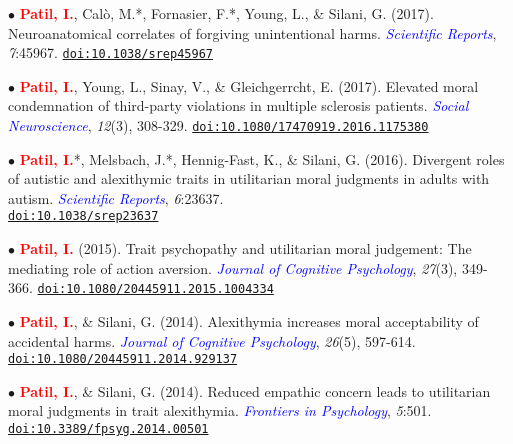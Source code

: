 \documentclass[10pt]{article}
\begin{document}
	$\bullet$ \textbf{\textcolor{red}{Patil, I.}}, Cal\`{o}, M.*, Fornasier, F.*, Young, L., \& Silani, G. (2017). Neuroanatomical correlates of forgiving \hspace*{0.1in}unintentional harms. \textit{\textcolor{blue}{Scientific Reports}}, \textit{7}:45967. \href{https://drive.google.com/open?id=0B6_u70YpdJKnRV81UnNlZHdrdXM}{\tt doi:10.1038/srep45967}
	\miniskip
	
	$\bullet$ \textbf{\textcolor{red}{Patil, I.}}, Young, L., Sinay, V., \& Gleichgerrcht, E. (2017). Elevated moral condemnation of third-party \hspace*{0.1in}violations in multiple sclerosis patients. \textit{\textcolor{blue}{Social Neuroscience}}, \textit{12}(3), 308-329. \hspace*{0.1in}\href{https://drive.google.com/open?id=0B6_u70YpdJKnT3M0bWpPdDY4RHc}{\tt doi:10.1080/17470919.2016.1175380}
	\miniskip
	
	$\bullet$ \textbf{\textcolor{red}{Patil, I.}}*, Melsbach, J.*, Hennig-Fast, K., \& Silani, G. (2016). Divergent roles of autistic and alexithymic \hspace*{0.1in}traits in utilitarian moral judgments in adults with autism. \textit{\textcolor{blue}{Scientific Reports}}, \textit{6}:23637.\\
	\hspace*{0.1in}\href{https://drive.google.com/file/d/0B6_u70YpdJKnV1p2UmNwa09iS1k/view?usp=sharing}{\tt doi:10.1038/srep23637}
	\miniskip
	
	$\bullet$ \textbf{\textcolor{red}{Patil, I.}} (2015). Trait psychopathy and utilitarian moral judgement: The mediating role of action aversion. \hspace*{0.1in}\textit{\textcolor{blue}{Journal of Cognitive Psychology}}, \textit{27}(3), 349-366. \href{https://drive.google.com/file/d/0B6_u70YpdJKnQjVJUFgtR2ZmWTVqZGxRMEFfemVIOUVuME5Z/view?usp=sharing}{\tt doi:10.1080/20445911.2015.1004334}
	\miniskip
	
	$\bullet$ \textbf{\textcolor{red}{Patil, I.}}, \& Silani, G. (2014). Alexithymia increases moral acceptability of accidental harms. \textit{\textcolor{blue}{Journal of \hspace*{0.1in}Cognitive Psychology}}, \textit{26}(5), 597-614. \href{https://drive.google.com/file/d/0B6_u70YpdJKnMU5pVHRUM3p0SFk/view?usp=sharing}{\tt doi:10.1080/20445911.2014.929137}
	\miniskip
	
	$\bullet$ \textbf{\textcolor{red}{Patil, I.}}, \& Silani, G. (2014). Reduced empathic concern leads to utilitarian moral judgments in trait \hspace*{0.1in}alexithymia. \textit{\textcolor{blue}{Frontiers in Psychology}}, \textit{5}:501. \href{https://drive.google.com/file/d/0B6_u70YpdJKnUkJZR252dXBwcVk/view?usp=sharing}{\tt doi:10.3389/fpsyg.2014.00501}
	\miniskip
	
\end{document}
